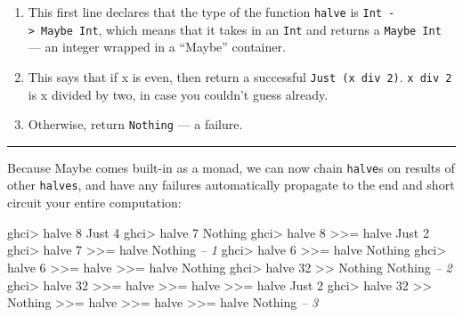 \documentclass[]{article}
\newenvironment{Shaded}{}{}
\newcommand{\CommentTok}[1]{\textcolor[rgb]{0.38,0.63,0.69}{\textit{#1}}}
\newcommand{\DataTypeTok}[1]{\textcolor[rgb]{0.56,0.13,0.00}{#1}}
\newcommand{\DecValTok}[1]{\textcolor[rgb]{0.25,0.63,0.44}{#1}}
\newcommand{\FunctionTok}[1]{\textcolor[rgb]{0.02,0.16,0.49}{#1}}
\newcommand{\NormalTok}[1]{#1}
\begin{document}
\begin{enumerate}
\def\labelenumi{\arabic{enumi}.}
\tightlist
\item
  This first line declares that the type of the function \texttt{halve} is
  \texttt{Int\ -\textgreater{}\ Maybe\ Int}, which means that it takes in an
  \texttt{Int} and returns a \texttt{Maybe\ Int} --- an integer wrapped in a
  ``Maybe'' container.
\item
  This says that if x is even, then return a successful
  \texttt{Just\ (x\ \textasciigrave{}div\textasciigrave{}\ 2)}.
  \texttt{x\ \textasciigrave{}div\textasciigrave{}\ 2} is x divided by two, in
  case you couldn't guess already.
\item
  Otherwise, return \texttt{Nothing} --- a failure.
\end{enumerate}

\begin{center}\rule{0.5\linewidth}{\linethickness}\end{center}

Because Maybe comes built-in as a monad, we can now chain \texttt{halve}s on
results of other \texttt{halves}, and have any failures automatically propagate
to the end and short circuit your entire computation:

\begin{Shaded}
\begin{Highlighting}[]
\NormalTok{ghci}\FunctionTok{>}\NormalTok{ halve }\DecValTok{8}
\DataTypeTok{Just} \DecValTok{4}
\NormalTok{ghci}\FunctionTok{>}\NormalTok{ halve }\DecValTok{7}
\DataTypeTok{Nothing}
\NormalTok{ghci}\FunctionTok{>}\NormalTok{ halve }\DecValTok{8} \FunctionTok{>>=}\NormalTok{ halve}
\DataTypeTok{Just} \DecValTok{2}
\NormalTok{ghci}\FunctionTok{>}\NormalTok{ halve }\DecValTok{7} \FunctionTok{>>=}\NormalTok{ halve}
\DataTypeTok{Nothing}                         \CommentTok{-- 1}
\NormalTok{ghci}\FunctionTok{>}\NormalTok{ halve }\DecValTok{6} \FunctionTok{>>=}\NormalTok{ halve}
\DataTypeTok{Nothing}
\NormalTok{ghci}\FunctionTok{>}\NormalTok{ halve }\DecValTok{6} \FunctionTok{>>=}\NormalTok{ halve }\FunctionTok{>>=}\NormalTok{ halve}
\DataTypeTok{Nothing}
\NormalTok{ghci}\FunctionTok{>}\NormalTok{ halve }\DecValTok{32} \FunctionTok{>>} \DataTypeTok{Nothing}
\DataTypeTok{Nothing}                         \CommentTok{-- 2}
\NormalTok{ghci}\FunctionTok{>}\NormalTok{ halve }\DecValTok{32} \FunctionTok{>>=}\NormalTok{ halve }\FunctionTok{>>=}\NormalTok{ halve }\FunctionTok{>>=}\NormalTok{ halve}
\DataTypeTok{Just} \DecValTok{2}
\NormalTok{ghci}\FunctionTok{>}\NormalTok{ halve }\DecValTok{32} \FunctionTok{>>} \DataTypeTok{Nothing} \FunctionTok{>>=}\NormalTok{ halve }\FunctionTok{>>=}\NormalTok{ halve }\FunctionTok{>>=}\NormalTok{ halve}
\DataTypeTok{Nothing}                         \CommentTok{-- 3}
\end{Highlighting}
\end{Shaded}
\end{document}
